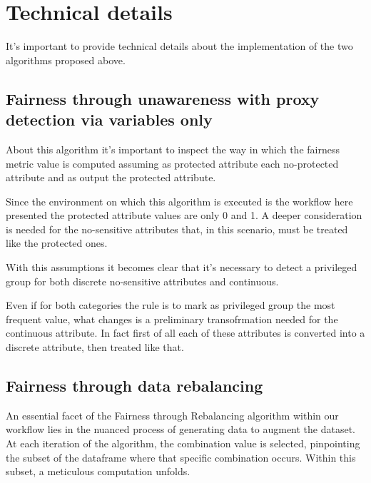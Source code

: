 \documentclass[12pt,a4paper,openright,twoside]{book}
\begin{document}
\chapter{Technical details}
\label{chap:technicals}

It's important to provide technical details about the implementation of the two algorithms proposed above.

\section{Fairness through unawareness with proxy detection via variables only}

About this algorithm it's important to inspect the way in which the fairness metric value is computed assuming as protected attribute each no-protected attribute and as output the protected attribute.

Since the environment on which this algorithm is executed is the workflow here presented the protected attribute values are only 0 and 1. A deeper consideration is needed for the no-sensitive attributes that, in this scenario, must be treated like the protected ones.

With this assumptions it becomes clear that it's necessary to detect a privileged group for both discrete no-sensitive attributes and continuous.

Even if for both categories the rule is to mark as privileged group the most frequent value, what changes is a preliminary transofrmation needed for the continuous attribute. In fact first of all each of these attributes is converted into a discrete attribute, then treated like that.



\section{Fairness through data rebalancing}

An essential facet of the Fairness through Rebalancing algorithm within our workflow lies in the nuanced process of generating data to augment the dataset. At each iteration of the algorithm, the combination value is selected, pinpointing the subset of the dataframe where that specific combination occurs. Within this subset, a meticulous computation unfolds.


\end{document}
